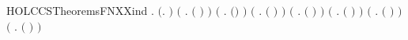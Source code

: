 \begin{SaveVerbatim}{HOLCCSTheoremsFNXXind}
\HOLTokenTurnstile{} \HOLSymConst{\HOLTokenForall{}}. \ensuremath{(}\HOLSymConst{\HOLTokenForall{}}.   \ensuremath{)} \HOLSymConst{\HOLTokenConj{}} \ensuremath{(}\HOLSymConst{\HOLTokenForall{}}  .    \HOLSymConst{\HOLTokenImp{}}  \ensuremath{(} \HOLSymConst{\ensuremath{\ldotp}}\ensuremath{)} \ensuremath{)} \HOLSymConst{\HOLTokenConj{}}
       \ensuremath{(}\HOLSymConst{\HOLTokenForall{}} .    \HOLSymConst{\HOLTokenImp{}}  \ensuremath{(}\HOLConst{\ensuremath{\tau}}\HOLSymConst{\ensuremath{\ldotp}}\ensuremath{)} \ensuremath{)} \HOLSymConst{\HOLTokenConj{}}
       \ensuremath{(}\HOLSymConst{\HOLTokenForall{}}  .    \HOLSymConst{\HOLTokenConj{}}    \HOLSymConst{\HOLTokenImp{}}  \ensuremath{(} \HOLSymConst{\ensuremath{+}} \ensuremath{)} \ensuremath{)} \HOLSymConst{\HOLTokenConj{}}
       \ensuremath{(}\HOLSymConst{\HOLTokenForall{}}  .    \HOLSymConst{\HOLTokenConj{}}    \HOLSymConst{\HOLTokenImp{}}  \ensuremath{(} \HOLSymConst{\ensuremath{\mid}} \ensuremath{)} \ensuremath{)} \HOLSymConst{\HOLTokenConj{}}
       \ensuremath{(}\HOLSymConst{\HOLTokenForall{}}  .    \HOLSymConst{\HOLTokenImp{}}  \ensuremath{(}  \ensuremath{)} \ensuremath{)} \HOLSymConst{\HOLTokenConj{}}
       \ensuremath{(}\HOLSymConst{\HOLTokenForall{}}  .    \HOLSymConst{\HOLTokenImp{}}  \ensuremath{(}  \ensuremath{)} \ensuremath{)} \HOLSymConst{\HOLTokenConj{}}
       \ensuremath{(}\HOLSymConst{\HOLTokenForall{}} .  \ensuremath{(} \ensuremath{)} \ensuremath{)} \HOLSymConst{\HOLTokenConj{}}

\end{SaveVerbatim}
